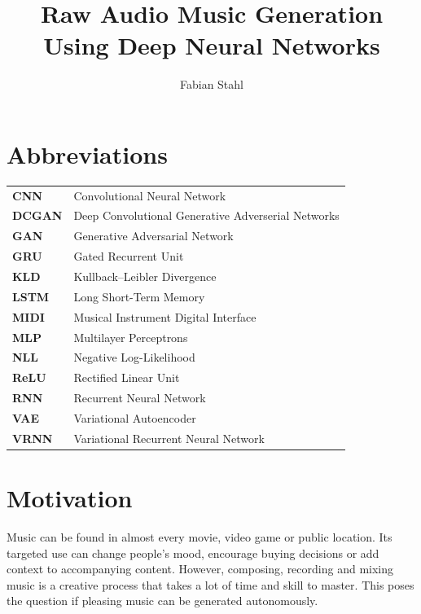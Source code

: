 \documentclass[12pt]{article}
\begin{document}
\setlength\parindent{0pt}
\title{Raw Audio Music Generation Using Deep Neural Networks}
\author{Fabian Stahl}


\maketitle

\tableofcontents

\newpage
\section*{Abbreviations}
\begin{center}
\begin{tabular}{l l}
\textbf{CNN} & Convolutional Neural Network \\
\textbf{DCGAN} & Deep Convolutional Generative Adverserial Networks\\
\textbf{GAN} & Generative Adversarial Network \\
\textbf{GRU} & Gated Recurrent Unit \\
\textbf{KLD}  & Kullback–Leibler Divergence\\
\textbf{LSTM} & Long Short-Term Memory \\
\textbf{MIDI} & Musical Instrument Digital Interface \\
\textbf{MLP} & Multilayer Perceptrons \\
\textbf{NLL} & Negative Log-Likelihood \\
\textbf{ReLU} & Rectified Linear Unit \\
\textbf{RNN} & Recurrent Neural Network \\
\textbf{VAE} & Variational Autoencoder \\
\textbf{VRNN} & Variational Recurrent Neural Network \\
\end{tabular}
\end{center}
\newpage


\section{Motivation}
Music can be found in almost every movie, video game or public location.
Its targeted use can change people's mood, encourage buying decisions or add context to accompanying content.
However, composing, recording and mixing music is a creative process that takes a lot of time and skill to master.
This poses the question if pleasing music can be generated autonomously.
\end{document}
